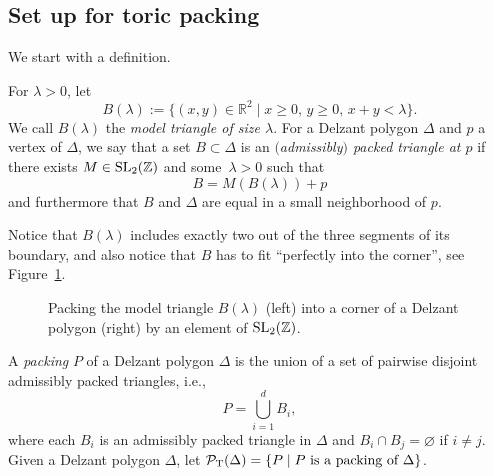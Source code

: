 \documentclass[10pt,a4paper]{amsart}
\numberwithin{equation}{section}
\def\R{{\mathbb R}}
\def\Z{{\mathbb Z}}
\newcommand{\De}{\Delta}
\newcommand{\PT}{\mathcal{P}_{\rm T}}
\newcommand{\SL}{{\rm SL}_2(\Z)}
\theoremstyle{definition}
\theoremstyle{plain}
\theoremstyle{plain}
\begin{document}
\subsection{Set up for toric packing}
We start with a definition.



\begin{Definition}\label{def:packedtriangle}
For $\lambda>0$, let
\[
B(\lambda) := \big\{(x,y)\in\R^2\mid x\geq 0, \,y\geq 0,\, x+y<\lambda\big\}.
\]
We call $B(\lambda)$ the \emph{model triangle of size $\lambda$}.
For a Delzant polygon $\De$ and $p$ a vertex of $\De$, we say that a set $B\subset \De$ is an \emph{$($admissibly$)$ packed triangle at $p$} if there exists $M \in \SL$ and some~$\lambda>0$ such that
\[B = M(B(\lambda)) + p\]
and furthermore that $B$ and $\De$ are equal in a small neighborhood of $p$.
\end{Definition}

Notice that $B(\lambda)$ includes exactly two out of the three segments of its boundary, and also notice that $B$ has to fit ``perfectly into the corner'', see Figure~\ref{fig:packing_ex}.






\begin{figure}
 \centering
 \caption{Packing the model triangle $B(\lambda)$ (left) into a corner of a Delzant polygon (right) by an element of $\SL$.}
 \label{fig:packing_ex}
\end{figure}



\begin{Definition}\label{def:DPacking}
A \emph{packing} $P$ of a Delzant polygon $\De$ is the union of a set of pairwise disjoint admissibly packed triangles, i.e.,
\[P = \bigcup_{i=1}^d B_i,\]
where each $B_i$ is an admissibly packed triangle in $\De$ and $B_i \cap B_j = \varnothing$
if $i \neq j$.
Given a Delzant polygon $\De$, let $\PT(\De) = \{P \mid P \text{ is a packing of } \De \}$.
\end{Definition}
\end{document}

